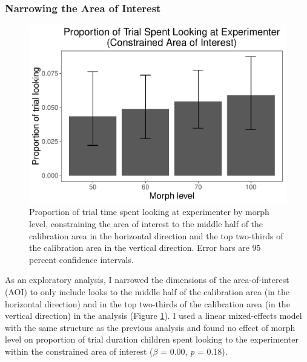 \documentclass[,man,floatsintext]{apa6}
\begin{document}
\hypertarget{narrowing-the-area-of-interest}{%
\subsubsection{Narrowing the Area of Interest}\label{narrowing-the-area-of-interest}}

\begin{figure}
\centering
\includegraphics{soc_ref_category_paper_files/figure-latex/morphconstrained-1.pdf}
\caption{\label{fig:morphconstrained}Proportion of trial time spent looking at experimenter by morph level, constraining the area of interest to the middle half of the calibration area in the horizontal direction and the top two-thirds of the calibration area in the vertical direction. Error bars are 95 percent confidence intervals.}
\end{figure}

As an exploratory analysis, I narrowed the dimensions of the area-of-interest (AOI) to only include looks to the middle half of the calibration area (in the horizontal direction) and in the top two-thirds of the calibration area (in the vertical direction) in the analysis (Figure \ref{fig:morphconstrained}). I used a linear mixed-effects model with the same structure as the previous analysis and found no effect of morph level on proportion of trial duration children spent looking to the experimenter within the constrained area of interest (\(\beta\) = 0.00, \emph{p} = 0.18).
\end{document}
